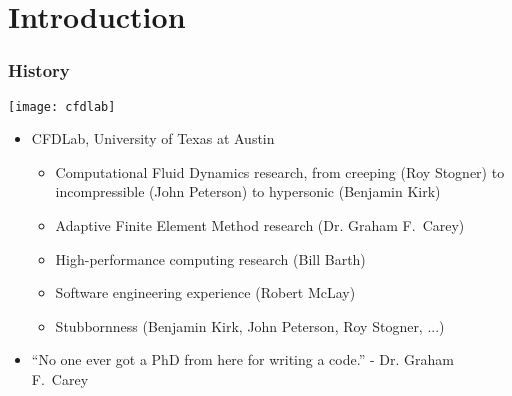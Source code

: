 

%




\section{Introduction}
\frame
{
  \frametitle{History}

  \begin{center}
  \texttt{[image: cfdlab]}
  \end{center}

  \begin{itemize}
    \item CFDLab, University of Texas at Austin
      \begin{itemize}
        \item Computational Fluid Dynamics research, from creeping
          (Roy Stogner) to incompressible (John Peterson) to hypersonic
          (Benjamin Kirk)
        \item Adaptive Finite Element Method research (Dr. Graham F.\ Carey)
        \item High-performance computing research (Bill Barth)
        \item Software engineering experience (Robert McLay)
        \item<3-> Stubbornness (Benjamin Kirk, John Peterson, Roy Stogner, ...)
      \end{itemize}
    \item<2-> ``No one ever got a PhD from here for writing a code.'' - Dr. Graham F.\ Carey
  \end{itemize}  


}



